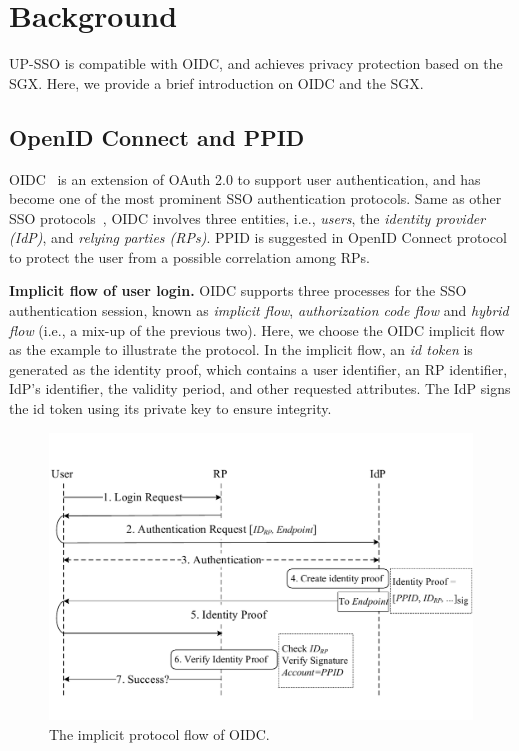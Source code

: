 \section{Background}
\label{sec:background}
UP-SSO is compatible with OIDC, and achieves privacy protection based on the SGX.
Here, we provide a brief introduction on OIDC and the SGX.
\subsection{OpenID Connect and PPID}
OIDC~\cite{OpenIDConnect} is an extension of OAuth 2.0 to support user authentication, and has become one of the most prominent SSO authentication protocols. 
Same as other SSO protocols~\cite{SAMLIdentifier}, OIDC involves three entities, i.e., {\em users}, the {\em identity provider (IdP)}, and {\em relying parties (RPs)}.
PPID is suggested in OpenID Connect protocol to protect the user from a possible correlation among RPs.

\vspace{3mm}\noindent\textbf{Implicit flow of user login.}
OIDC supports three processes for the SSO authentication session, known as {\em implicit flow}, {\em authorization code flow} and {\em hybrid flow} (i.e., a mix-up of the previous two). Here, we choose the OIDC implicit flow as the example to illustrate the protocol. 
In the implicit flow, an {\em id token} is generated as the identity proof, which contains a user identifier, an RP identifier, IdP's identifier, the validity period, and other requested attributes.
The IdP signs the id token using its private key to ensure integrity.

\begin{figure}[t]
  \centering
  \includegraphics[width=\linewidth]{fig/OIDC1.pdf}
  \caption{The implicit protocol flow of OIDC.}
  \label{fig:OpenID}
\end{figure}

